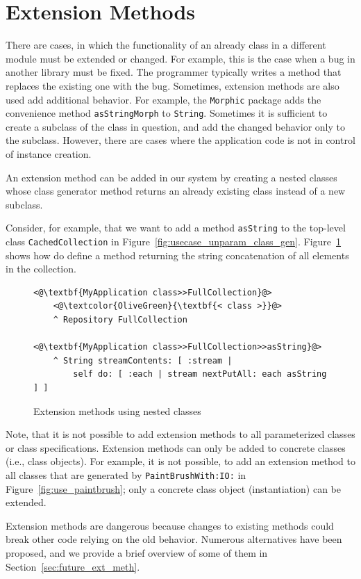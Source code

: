 \section{Extension Methods}
There are cases, in which the functionality of an already class in a different module must be extended or changed. For example, this is the case when a bug in another library must be fixed. The programmer typically writes a method that replaces the existing one with the bug. Sometimes, extension methods are also used add additional behavior. For example, the \texttt{Morphic} package adds the convenience method \texttt{asStringMorph} to \texttt{String}. Sometimes it is sufficient to create a subclass of the class in question, and add the changed behavior only to the subclass. However, there are cases where the application code is not in control of instance creation.

An extension method can be added in our system by creating a nested classes whose class generator method returns an already existing class instead of a new subclass.

Consider, for example, that we want to add a method \texttt{asString} to the top-level class \texttt{CachedCollection} in Figure~\ref{fig:usecase_unparam_class_gen}. Figure~\ref{fig:use_ext_meth} shows how do define a method returning the string concatenation of all elements in the collection.

\begin{figure}[!htp]
\begin{lstlisting}
<@\textbf{MyApplication class>>FullCollection}@>
    <@\textcolor{OliveGreen}{\textbf{< class >}}@>
    ^ Repository FullCollection

<@\textbf{MyApplication class>>FullCollection>>asString}@>
    ^ String streamContents: [ :stream |
        self do: [ :each | stream nextPutAll: each asString ] ]
\end{lstlisting}
\caption{Extension methods using nested classes}
\label{fig:use_ext_meth}
\end{figure}

Note, that it is not possible to add extension methods to all parameterized classes or class specifications. Extension methods can only be added to concrete classes (i.e., class objects). For example, it is not possible, to add an extension method to all classes that are generated by \texttt{PaintBrushWith:IO:} in Figure~\ref{fig:use_paintbrush}; only a concrete class object (instantiation) can be extended.

Extension methods are dangerous because changes to existing methods could break other code relying on the old behavior. Numerous alternatives have been proposed, and we provide a brief overview of some of them in Section~\ref{sec:future_ext_meth}.
